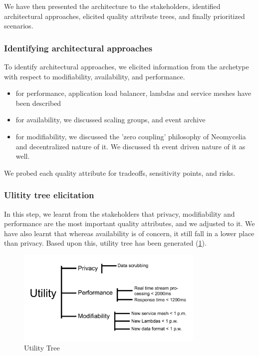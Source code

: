 \documentclass[conference]{IEEEtran}
\begin{document}
We have then presented the architecture to the stakeholders, identified architectural approaches, elicited quality attribute trees, and finally prioritized scenarios.

\subsubsection{Identifying architectural approaches}

To identify architectural approaches, we elicited information from the archetype with respect to modifiability, availability, and performance.

\begin{itemize}
    \item for performance, application load balancer, lambdas and service meshes have been described
    \item for availability, we discussed scaling groups, and event archive
    \item for modifiability, we discussed the 'zero coupling' philosophy of Neomycelia and decentralized nature of it. We discussed th event driven nature of it as well.
\end{itemize}

We probed each quality attribute for tradeoffs, sensitivity points, and risks.

\subsubsection{Ulitity tree elicitation}

In this step, we learnt from the stakeholders that privacy, modifiability and performance are the most important quality attributes, and we adjusted to it. We have also learnt that whereas availability is of concern, it still fall in a lower place than privacy. Based upon this, utility tree has been generated (\ref{UtilityFig}).


\begin{figure}
    \centering
    \includegraphics[width=9cm]{Utility Tree.pdf}
    \caption{Utility Tree} \label{UtilityFig}
\end{figure}
\end{document}
